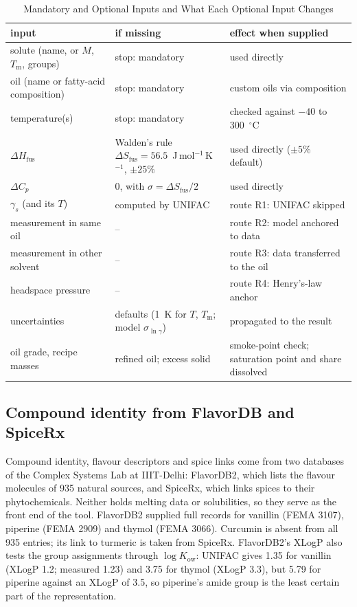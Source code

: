 \documentclass[journal=jceaax,manuscript=article,layout=twocolumn]{achemso}
\begin{document}
\begin{table}
\caption{Mandatory and Optional Inputs and What Each Optional Input Changes}
\label{tab:inputs}
\small
\begin{tabular}{p{}p{}p{}}
\toprule
input & if missing & effect when supplied\\
\midrule
solute (name, or $M$, $T_\mathrm{m}$, groups) & stop: mandatory & used directly\\
oil (name or fatty-acid composition) & stop: mandatory & custom oils via composition\\
temperature(s) & stop: mandatory & checked against $-40$ to 300~$^\circ$C\\
$\Delta H_\mathrm{fus}$ & Walden's rule\cite{walden1908} $\Delta S_\mathrm{fus}=56.5$~J\,mol$^{-1}$\,K$^{-1}$, $\pm25\%$ & used directly ($\pm5\%$ default)\\
$\Delta C_p$ & 0, with $\sigma=\Delta S_\mathrm{fus}/2$ & used directly\\
$\gamma_s$ (and its $T$) & computed by UNIFAC & route R1: UNIFAC skipped\\
measurement in same oil & -- & route R2: model anchored to data\\
measurement in other solvent & -- & route R3: data transferred to the oil\\
headspace pressure & -- & route R4: Henry's-law anchor\\
uncertainties & defaults (1~K for $T$, $T_\mathrm{m}$; model $\sigma_{\ln\gamma}$) & propagated to the result\\
oil grade, recipe masses & refined oil; excess solid & smoke-point check; saturation point and share dissolved\\
\bottomrule
\end{tabular}
\end{table}

\subsection{Compound identity from FlavorDB and SpiceRx}
Compound identity, flavour descriptors and spice links come from two databases of the Complex Systems Lab at IIIT-Delhi: FlavorDB2,\cite{garg2018,goel2024} which lists the flavour molecules of 935 natural sources, and SpiceRx,\cite{rakhi2018,rakhi2018spicerx} which links spices to their phytochemicals. Neither holds melting data or solubilities, so they serve as the front end of the tool. FlavorDB2 supplied full records for vanillin (FEMA 3107), piperine (FEMA 2909) and thymol (FEMA 3066). Curcumin is absent from all 935 entries; its link to turmeric is taken from SpiceRx. FlavorDB2's XLogP also tests the group assignments through $\log K_\mathrm{ow}$: UNIFAC gives 1.35 for vanillin (XLogP 1.2; measured 1.23) and 3.75 for thymol (XLogP 3.3), but 5.79 for piperine against an XLogP of 3.5, so piperine's amide group is the least certain part of the representation.
\end{document}
